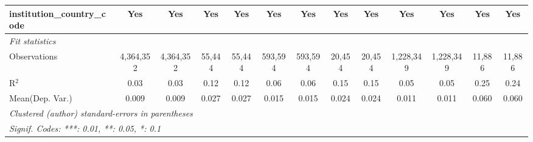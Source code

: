 \begin{tabular}{lcccccccccccc}
   institution\_country\_code               & Yes            & Yes             & Yes            & Yes            & Yes            & Yes             & Yes          & Yes             & Yes            & Yes              & Yes            & Yes\\  
   \midrule
   \emph{Fit statistics}\\
   Observations                             & 4,364,352      & 4,364,352       & 55,444         & 55,444         & 593,594        & 593,594         & 20,454       & 20,454          & 1,228,349      & 1,228,349        & 11,886         & 11,886\\  
   R$^2$                                    & 0.03           & 0.03            & 0.12           & 0.12           & 0.06           & 0.06            & 0.15         & 0.15            & 0.05           & 0.05             & 0.25           & 0.24\\  
Mean(Dep. Var.) & 0.009 & 0.009 & 0.027 & 0.027 & 0.015 & 0.015 & 0.024 & 0.024 & 0.011 & 0.011 & 0.060 & 0.060 \\
   \midrule \midrule
   \multicolumn{13}{l}{\emph{Clustered (author) standard-errors in parentheses}}\\
   \multicolumn{13}{l}{\emph{Signif. Codes: ***: 0.01, **: 0.05, *: 0.1}}\\
\end{tabular}
\par\endgroup
